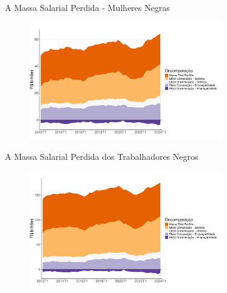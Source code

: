 \documentclass[10pt, xcolor=x11names,compress]{beamer}
\begin{document}
	\begin{frame}{A Massa Salarial Perdida - Mulheres Negras}
	\begin{figure}
		\centering
		\includegraphics[width = 0.75\textwidth]{figures_output/mulher_negra_massa_perdida_gph.pdf}
	\end{figure}
	\end{frame}		
	
	\begin{frame}{A Massa Salarial Perdida dos Trabalhadores Negros}
	\begin{figure}
		\centering
		\includegraphics[width = 0.75\textwidth]{figures_output/massa_perdida_gph.pdf}
	\end{figure}
	\end{frame}		

	
\end{document}
